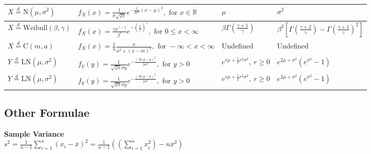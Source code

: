\documentclass{article}
\begin{document}
\begin{table}[h!]
\begin{tabular}{@{}llll@{}}
    $X\stackrel{d}{=}\mbox{N}(\mu, \sigma^2)$       & $f_X(x)=\frac{1}{\sigma \sqrt{2\pi}}e^{-\frac{1}{2\sigma^2}(x-\mu)^2}, \mbox{ for } x \in \mathbb{R}$                              & $\mu$                                                       & $\sigma^2$                                                                                                         \\ \midrule
    $X\stackrel{d}{=}\mbox{Weibull}(\beta, \gamma)$ & $f_X(x)=\frac{\gamma x^{\gamma - 1}}{\beta^\gamma}e^{-(\frac{x}{\beta})^\gamma}, \mbox{ for } 0 \leq x < \infty$                   & $\beta \Gamma\left(\frac{\gamma + 1}{\gamma}\right)$        & $\beta^2 \left[\Gamma\left(\frac{\gamma + 2}{\gamma}\right)-\Gamma\left(\frac{\gamma + 1}{\gamma}\right)^2\right]$ \\ \midrule
    $X\stackrel{d}{=}\mbox{C}(m, a)$                & $f_X(x)=\frac{1}{\pi} \frac{a}{a^2 + (x-m)^2}, \mbox{ for } -\infty < x < \infty$                                                  & Undefined                                                   & Undefined                                                                                                          \\ \midrule
    $Y \stackrel{d}{=} \mbox{LN}(\mu, \sigma^2)$    & $f_Y(y)=\frac{1}{\sqrt{2\pi}\sigma y}e^{-\frac{(\ln y - \mu)^2}{2\sigma^2}}, \mbox{ for } y > 0$                                   & $e^{r\mu + \frac{1}{2}r^2 \sigma^2},\ r \geq 0$             & $e^{2\mu + \sigma^2}(e^{\sigma^2}-1)$                                                                              \\ \midrule
    $Y \stackrel{d}{=} \mbox{LN}(\mu, \sigma^2)$    & $f_Y(y)=\frac{1}{\sqrt{2\pi}\sigma y}e^{-\frac{(\ln y - \mu)^2}{2\sigma^2}}, \mbox{ for } y > 0$                                   & $e^{r\mu + \frac{1}{2}r^2 \sigma^2},\ r \geq 0$             & $e^{2\mu + \sigma^2}(e^{\sigma^2}-1)$                                                                              \\ \bottomrule
    \end{tabular}
    \end{table}

\begin{multicols*}{2}
\subsection*{Other Formulae}
\textbf{Sample Variance}\\
$s^2 = \frac{1}{n-1} \sum_{i=1}^{n} (x_{i}-\bar{x})^2 = \frac{1}{n-1} \left( \left( \sum_{i=1}^{n} x_{i}^2 \right) -n \bar{x}^2 \right)$
\end{multicols*}
\end{document}
